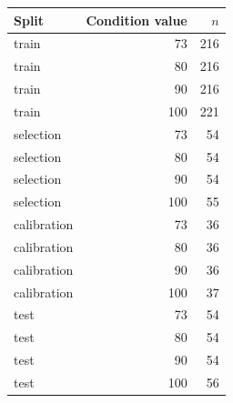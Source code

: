 \begin{tabular}{lrr}
\toprule
Split & Condition value & $n$\\
\midrule
train & 73 & 216\\
train & 80 & 216\\
train & 90 & 216\\
train & 100 & 221\\
selection & 73 & 54\\
selection & 80 & 54\\
selection & 90 & 54\\
selection & 100 & 55\\
calibration & 73 & 36\\
calibration & 80 & 36\\
calibration & 90 & 36\\
calibration & 100 & 37\\
test & 73 & 54\\
test & 80 & 54\\
test & 90 & 54\\
test & 100 & 56\\
\bottomrule
\end{tabular}

